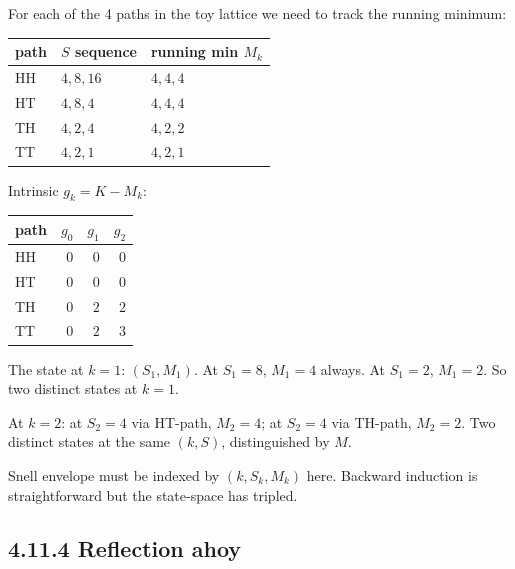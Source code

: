 \documentclass[
  10pt,
  twoside]{book}
\newcounter{none} %
\begin{document}
For each of the 4 paths in the toy lattice we need to track the running
minimum:

{\def\LTcaptype{none} %
\begin{table}[H]
\centering
\begin{tabular}{|l|l|l|}
\toprule
path & \(S\) sequence & running min \(M_k\) \\
\midrule



HH & \(4, 8, 16\) & \(4, 4, 4\) \\
HT & \(4, 8, 4\) & \(4, 4, 4\) \\
TH & \(4, 2, 4\) & \(4, 2, 2\) \\
TT & \(4, 2, 1\) & \(4, 2, 1\) \\
\bottomrule
\end{tabular}
\end{table}
}

Intrinsic \(g_k = K - M_k\):

{\def\LTcaptype{none} %
\begin{table}[H]
\centering
\begin{tabular}{|l|r|r|r|}
\toprule
path & \(g_0\) & \(g_1\) & \(g_2\) \\
\midrule



HH & \(0\) & \(0\) & \(0\) \\
HT & \(0\) & \(0\) & \(0\) \\
TH & \(0\) & \(2\) & \(2\) \\
TT & \(0\) & \(2\) & \(3\) \\
\bottomrule
\end{tabular}
\end{table}
}

The state at \(k=1\): \((S_1, M_1)\). At \(S_1 = 8\), \(M_1 = 4\)
always. At \(S_1 = 2\), \(M_1 = 2\). So two distinct states at
\(k = 1\).

At \(k = 2\): at \(S_2 = 4\) via HT-path, \(M_2 = 4\); at \(S_2 = 4\)
via TH-path, \(M_2 = 2\). Two distinct states at the same \((k, S)\),
distinguished by \(M\).

Snell envelope must be indexed by \((k, S_k, M_k)\) here. Backward
induction is straightforward but the state-space has tripled.

\subsection{4.11.4 Reflection ahoy}\label{reflection-ahoy}
\end{document}
